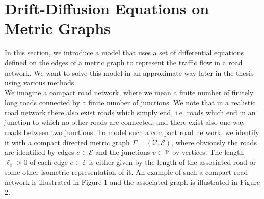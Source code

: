 \section{Drift-Diffusion Equations on Metric Graphs}
\label{ch1:sec2}

In this section, we introduce a model that uses a set of differential equations defined on the edges of a metric graph to represent the traffic flow in a road network. We want to solve this model in an approximate way later in the thesis using various methods. \\
We imagine a compact road network, where we mean a finite number of finitely long roads connected by a finite number of junctions. We note that in a realistic road network there also exist roads which simply end, i.e. roads which end in an junction to which no other roads are connected, and there exist also one-way roads between two junctions. To model such a compact road network, we identify it with a compact directed metric graph $\Gamma = (\mathcal{V}, \mathcal{E})$, where obviously the roads are identified by edges $e \in \mathcal{E}$ and the junctions $v \in \mathcal{V}$ by vertices. The length $\ell_e > 0$ of each edge $e \in \mathcal{E}$ is either given by the length of the associated road or some other isometric representation of it. An example of such a compact road network is illustrated in Figure 1 and the associated graph is illustrated in Figure 2. \\

